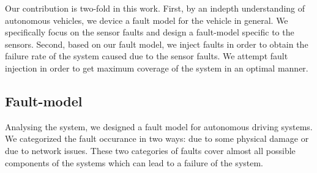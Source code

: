 

Our contribution is two-fold in this work. First, by an indepth understanding of autonomous vehicles, we device a fault model for the vehicle in general. We specifically focus on the sensor faults and design a fault-model specific to the sensors. Second, based on our fault model, we inject faults in order to obtain the failure rate of the system caused due to the sensor faults. We attempt fault injection in order to get maximum coverage of the system in an optimal manner.

\subsection{Fault-model}
Analysing the system, we designed a fault model for autonomous driving systems. We categorized the fault occurance in two ways: due to some physical damage or due to network issues. These two categories of faults cover almost all possible components of the systems which can lead to a failure of the system. 


